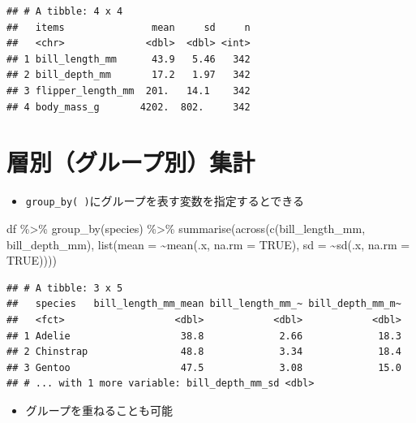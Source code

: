 \documentclass[
  xelatex,ja=standard, b5paper]{bxjsbook}
\newenvironment{Shaded}{\begin{snugshade}}{\end{snugshade}}
\newcommand{\AttributeTok}[1]{\textcolor[rgb]{0.77,0.63,0.00}{#1}}
\newcommand{\ConstantTok}[1]{\textcolor[rgb]{0.00,0.00,0.00}{#1}}
\newcommand{\FunctionTok}[1]{\textcolor[rgb]{0.00,0.00,0.00}{#1}}
\newcommand{\NormalTok}[1]{#1}
\newcommand{\SpecialCharTok}[1]{\textcolor[rgb]{0.00,0.00,0.00}{#1}}
\providecommand{\tightlist}{%
  \setlength{\itemsep}{0pt}\setlength{\parskip}{0pt}}
\begin{document}
\begin{verbatim}
## # A tibble: 4 x 4
##   items               mean     sd     n
##   <chr>              <dbl>  <dbl> <int>
## 1 bill_length_mm      43.9   5.46   342
## 2 bill_depth_mm       17.2   1.97   342
## 3 flipper_length_mm  201.   14.1    342
## 4 body_mass_g       4202.  802.     342
\end{verbatim}

\hypertarget{su-group}{%
\section{層別（グループ別）集計}\label{su-group}}

\begin{itemize}
\tightlist
\item
  \texttt{group\_by(\ )}にグループを表す変数を指定するとできる
\end{itemize}

\begin{Shaded}
\begin{Highlighting}[]
\NormalTok{df }\SpecialCharTok{\%\textgreater{}\%} 
  \FunctionTok{group\_by}\NormalTok{(species) }\SpecialCharTok{\%\textgreater{}\%} 
  \FunctionTok{summarise}\NormalTok{(}\FunctionTok{across}\NormalTok{(}\FunctionTok{c}\NormalTok{(bill\_length\_mm, bill\_depth\_mm),}
                   \FunctionTok{list}\NormalTok{(}\AttributeTok{mean =} \SpecialCharTok{\textasciitilde{}}\FunctionTok{mean}\NormalTok{(.x, }\AttributeTok{na.rm =} \ConstantTok{TRUE}\NormalTok{),}
                        \AttributeTok{sd =} \SpecialCharTok{\textasciitilde{}}\FunctionTok{sd}\NormalTok{(.x, }\AttributeTok{na.rm =} \ConstantTok{TRUE}\NormalTok{))))}
\end{Highlighting}
\end{Shaded}

\begin{verbatim}
## # A tibble: 3 x 5
##   species   bill_length_mm_mean bill_length_mm_~ bill_depth_mm_m~
##   <fct>                   <dbl>            <dbl>            <dbl>
## 1 Adelie                   38.8             2.66             18.3
## 2 Chinstrap                48.8             3.34             18.4
## 3 Gentoo                   47.5             3.08             15.0
## # ... with 1 more variable: bill_depth_mm_sd <dbl>
\end{verbatim}

\begin{itemize}
\tightlist
\item
  グループを重ねることも可能
\end{itemize}
\end{document}
